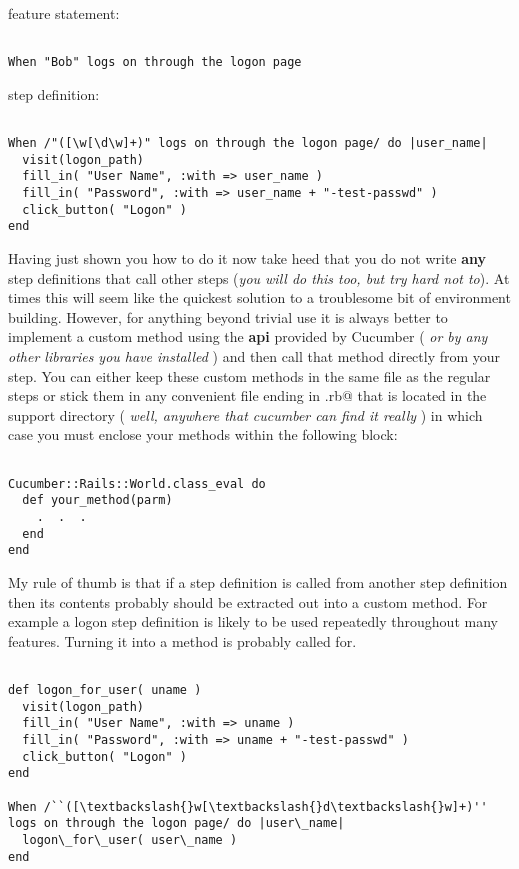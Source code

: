 feature statement:
\begin{verbatim}

When "Bob" logs on through the logon page

\end{verbatim}

step definition:
\begin{verbatim}

When /"([\w[\d\w]+)" logs on through the logon page/ do |user_name|
  visit(logon_path)
  fill_in( "User Name", :with => user_name )
  fill_in( "Password", :with => user_name + "-test-passwd" )
  click_button( "Logon" )
end

\end{verbatim}

Having just shown you how to do it now take heed that you do not write \textbf{any} step definitions that call other steps (\emph{you will do this too, but try hard not to}).  At times this will seem like the quickest solution to a troublesome bit of environment building.  However, for anything beyond trivial use it is always better to implement a custom method using the \textbf{api} provided by Cucumber ( \emph{or by any other libraries you have installed} ) and then call that method directly from your step.  You can either keep these custom methods in the same file as the regular steps or stick them in any convenient file ending in \verb@.rb@ that is located in the support directory ( \emph{well, anywhere that cucumber can find it really} ) in which case you must enclose your methods within the following block:
\begin{verbatim}

Cucumber::Rails::World.class_eval do
  def your_method(parm)
    .  .  .
  end
end

\end{verbatim}

My rule of thumb is that if a step definition is called from another step definition then its contents probably should be extracted out into a custom method.  For example a logon step definition is likely to be used repeatedly throughout many features.  Turning it into a method is probably called for.
\begin{verbatim}

def logon_for_user( uname )
  visit(logon_path)
  fill_in( "User Name", :with => uname )
  fill_in( "Password", :with => uname + "-test-passwd" )
  click_button( "Logon" )
end

When /``([\textbackslash{}w[\textbackslash{}d\textbackslash{}w]+)'' logs on through the logon page/ do |user\_name|
  logon\_for\_user( user\_name )
end

\end{verbatim}

